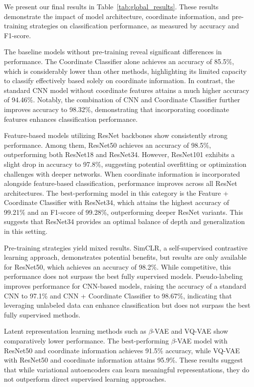 \documentclass{article}
\begin{document}
We present our final results in Table~\ref{tab:global_results}. These results
demonstrate the impact of model architecture, coordinate information, and
pre-training strategies on classification performance, as measured by accuracy
and F1-score.

The baseline models without pre-training reveal significant differences in
performance. The Coordinate Classifier alone achieves an accuracy of 85.5\%,
which is considerably lower than other methods, highlighting its limited
capacity to classify effectively based solely on coordinate information. In
contrast, the standard CNN model without coordinate features attains a much
higher accuracy of 94.46\%. Notably, the combination of CNN and Coordinate
Classifier further improves accuracy to 98.32\%, demonstrating that
incorporating coordinate features enhances classification performance.

Feature-based models utilizing ResNet backbones show consistently strong
performance. Among them, ResNet50 achieves an accuracy of 98.5\%, outperforming
both ResNet18 and ResNet34. However, ResNet101 exhibits a slight drop in
accuracy to 97.8\%, suggesting potential overfitting or optimization challenges
with deeper networks. When coordinate information is incorporated alongside
feature-based classification, performance improves across all ResNet
architectures. The best-performing model in this category is the Feature +
Coordinate Classifier with ResNet34, which attains the highest accuracy of
99.21\% and an F1-score of 99.28\%, outperforming deeper ResNet variants. This
suggests that ResNet34 provides an optimal balance of depth and generalization
in this setting.

Pre-training strategies yield mixed results. SimCLR, a self-supervised
contrastive learning approach, demonstrates potential benefits, but results are
only available for ResNet50, which achieves an accuracy of 98.2\%. While
competitive, this performance does not surpass the best fully supervised
models. Pseudo-labeling improves performance for CNN-based models, raising the
accuracy of a standard CNN to 97.1\% and CNN + Coordinate Classifier to
98.67\%, indicating that leveraging unlabeled data can enhance classification
but does not surpass the best fully supervised methods.

Latent representation learning methods such as $\beta$-VAE and VQ-VAE show
comparatively lower performance. The best-performing $\beta$-VAE model with
ResNet50 and coordinate information achieves 91.5\% accuracy, while VQ-VAE with
ResNet50 and coordinate information attains 95.9\%. These results suggest that
while variational autoencoders can learn meaningful representations, they do
not outperform direct supervised learning approaches.
\end{document}
